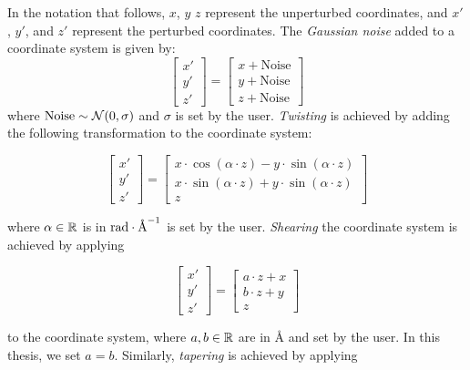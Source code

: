 In the notation that follows, $x$, $y$ $z$ represent the unperturbed coordinates, and
$x'$, $y'$, and $z'$ represent the perturbed coordinates. The \emph{Gaussian noise} added to a coordinate system is given by:
\begin{equation}
  \label{eq:gaussian_noise}
  \begin{bmatrix}
    x' \\
    y' \\
    z'
  \end{bmatrix} =
  \begin{bmatrix}
    x+ \text{Noise} \\
    y+ \text{Noise} \\
    z+ \text{Noise}
  \end{bmatrix}
\end{equation}
where $\text{Noise}\sim\mathcal{N}(0,\sigma)$ and $\sigma$ is set by the user.
\emph{Twisting} is achieved by adding the following transformation to the coordinate
system:

\begin{equation}
  \label{eq:twisting}
  \begin{bmatrix}
    x' \\
    y' \\
    z'
  \end{bmatrix} =
  \begin{bmatrix}
    x\cdot\cos(\alpha\cdot z) - y\cdot\sin(\alpha\cdot z) \\
    x\cdot\sin(\alpha\cdot z) + y\cdot\sin(\alpha\cdot z) \\
    z
  \end{bmatrix}
\end{equation}

where $\alpha\in\mathbb{R}$ is in $\textnormal{rad}\cdot\si{
\angstrom}^{-1}$ is set by the user. \emph{Shearing} the coordinate system is achieved
by applying

\begin{equation}
  \label{eq:shearing}
  \begin{bmatrix}
    x' \\
    y' \\
    z'
  \end{bmatrix} =
  \begin{bmatrix}
    a \cdot z + x\\
    b \cdot z + y\\
    z
  \end{bmatrix}
\end{equation}

to the coordinate system, where $a, b\in\mathbb{R}$ are in \si{\angstrom} and set by the user. In this thesis, we set $a=b$. Similarly,
\emph{tapering} is achieved by applying


